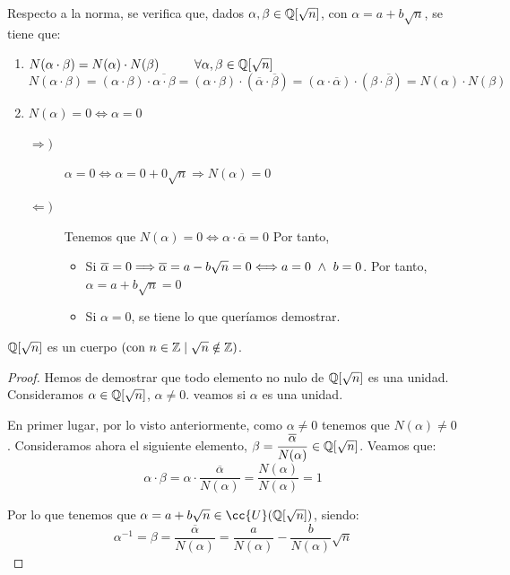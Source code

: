 Respecto a la norma, se verifica que, dados $\alpha, \beta \in \mathbb Q[\sqrt{n}]$, con $\alpha=a+b\sqrt{n}$, se tiene que:
\begin{enumerate}
    \item $N(\alpha \cdot \beta) = N(\alpha) \cdot N(\beta) \hspace{1cm} \forall \alpha, \beta \in \mathbb Q[\sqrt{n}]$
    \begin{equation*}
        N(\alpha \cdot \beta)
        = (\alpha \cdot \beta) \cdot \overline{\alpha \cdot \beta}
        = (\alpha \cdot \beta) \cdot (\overline{\alpha} \cdot \overline{\beta})
        = (\alpha \cdot \overline{\alpha}) \cdot (\beta \cdot \overline{\beta})
        = N(\alpha) \cdot N(\beta)
    \end{equation*}

    \item $N(\alpha) = 0 \Longleftrightarrow \alpha = 0$
    \begin{description}
        \item[$\Longrightarrow)$] $\alpha = 0 \Longleftrightarrow \alpha = 0 + 0\sqrt{n} \Longrightarrow N(\alpha) = 0$

        \item[$\Longleftarrow)$] Tenemos que $N(\alpha) = 0 \Longleftrightarrow \alpha \cdot \overline{\alpha} = 0$
        Por tanto,
        \begin{itemize}
            \item Si $\overline{\alpha} = 0 \Longrightarrow \overline{\alpha} = a-b\sqrt{n} = 0 \Longleftrightarrow a = 0 \ \land \  b = 0$. Por tanto, $\alpha=a+b\sqrt{n} = 0$

            \item Si $\alpha = 0$, se tiene lo que queríamos demostrar.
        \end{itemize}
    \end{description}
\end{enumerate}

\begin{prop}
    $\mathbb Q[\sqrt{n}]$ es un cuerpo $(\mbox{con } n \in \mathbb Z \mid \sqrt{n} \notin \mathbb Z)$.
\end{prop}
\begin{proof}
    Hemos de demostrar que todo elemento no nulo de $\mathbb Q[\sqrt{n}]$ es una unidad. Consideramos $\alpha\in \mathbb Q[\sqrt{n}]$, $\alpha\neq 0$. veamos si $\alpha$ es una unidad.

    En primer lugar, por lo visto anteriormente, como $\alpha\neq 0$ tenemos que $N(\alpha)\neq 0$. Consideramos ahora el siguiente elemento, $\beta = \dfrac{\overline{\alpha}}{N(\alpha)} \in \mathbb Q[\sqrt{n}]$. Veamos que:
    $$\alpha \cdot \beta = \alpha \cdot \dfrac{\overline{\alpha}}{N(\alpha)} = \frac{N(\alpha)}{N(\alpha)}= 1$$
    
    Por lo que tenemos que $\alpha=a+b\sqrt{n} \in \cc{U}(\Q[\sqrt{n}])$, siendo: $$\alpha^{-1} = \beta = \frac{\overline{\alpha}}{N(\alpha)} = \frac{a}{N(\alpha)} - \frac{b}{N(\alpha)}\sqrt{n}$$
\end{proof}

